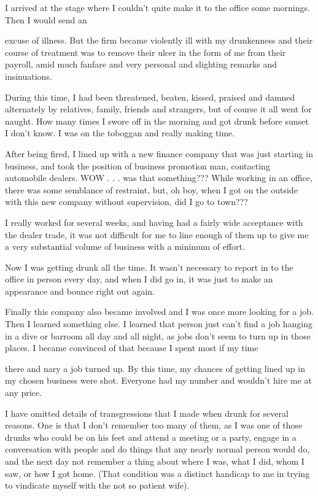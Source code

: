 \begin{biblechapter}
I arrived at the stage where I couldn’t quite make it to the office some mornings. Then I would send an

excuse of illness. But the firm became violently ill with my drunkenness and their course of treatment was to remove their ulcer in the form of me from their payroll, amid much fanfare and very personal and slighting remarks and insinuations.

During this time, I had been threatened, beaten, kissed, praised and damned alternately by relatives, family, friends and strangers, but of course it all went for naught. How many times I swore off in the morning and got drunk before sunset I don’t know. I was on the toboggan and really making time.

After being fired, I lined up with a new finance company that was just starting in business, and took the position of business promotion man, contacting automobile dealers. WOW . . . was that something??? While working in an office, there was some semblance of restraint, but, oh boy, when I got on the outside with this new company without supervision, did I go to town???

I really worked for several weeks, and having had a fairly wide acceptance with the dealer trade, it was not difficult for me to line enough of them up to give me a very substantial volume of business with a minimum of effort.

Now I was getting drunk all the time. It wasn’t necessary to report in to the office in person every day, and when I did go in, it was just to make an appearance and bounce right out again.

Finally this company also became involved and I was once more looking for a job. Then I learned something else. I learned that person just can’t find a job hanging in a dive or barroom all day and all night, as jobs don’t seem to turn up in those places. I became convinced of that because I spent most if my time

there and nary a job turned up. By this time, my chances of getting lined up in my chosen business were shot. Everyone had my number and wouldn’t hire me at any price.

I have omitted details of transgressions that I made when drunk for several reasons. One is that I don’t remember too many of them, as I was one of those drunks who could be on his feet and attend a meeting or a party, engage in a conversation with people and do things that any nearly normal person would do, and the next day not remember a thing about where I was, what I did, whom I saw, or how I got home. (That condition was a distinct handicap to me in trying to vindicate myself with the not so patient wife).


\end{biblechapter}
